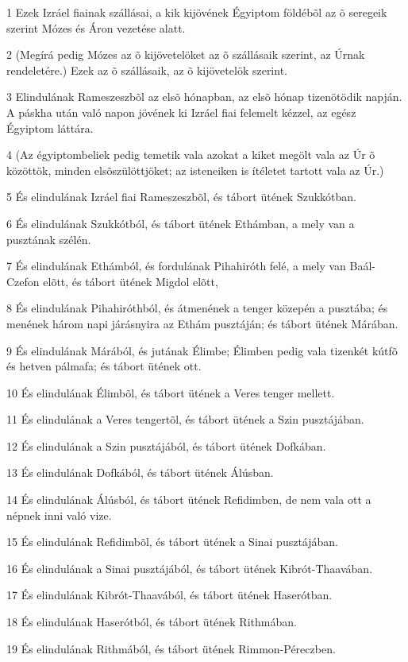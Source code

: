\par 1 Ezek Izráel fiainak szállásai, a kik kijövének Égyiptom földébõl az õ seregeik szerint Mózes és Áron vezetése alatt.
\par 2 (Megírá pedig Mózes az õ kijövetelöket az õ szállásaik szerint, az Úrnak rendeletére.) Ezek az õ szállásaik, az õ kijövetelök szerint.
\par 3 Elindulának Rameszeszbõl az elsõ hónapban, az elsõ hónap tizenötödik napján. A páskha után való napon jövének ki Izráel fiai felemelt kézzel, az egész Égyiptom láttára.
\par 4 (Az égyiptombeliek pedig temetik vala azokat a kiket megölt vala az Úr õ közöttök, minden elsõszülöttjöket; az isteneiken is ítéletet tartott vala az Úr.)
\par 5 És elindulának Izráel fiai Rameszeszbõl, és tábort ütének Szukkótban.
\par 6 És elindulának Szukkótból, és tábort ütének Ethámban, a mely van a pusztának szélén.
\par 7 És elindulának Ethámból, és fordulának Pihahiróth felé, a mely van Baál-Czefon elõtt, és tábort ütének Migdol elõtt,
\par 8 És elindulának Pihahiróthból, és átmenének a tenger közepén a pusztába; és menének három napi járásnyira az Ethám pusztáján; és tábort ütének Márában.
\par 9 És elindulának Márából, és jutának Élimbe; Élimben pedig vala tizenkét kútfõ és hetven pálmafa; és tábort ütének ott.
\par 10 És elindulának Élimbõl, és tábort ütének a Veres tenger mellett.
\par 11 És elindulának a Veres tengertõl, és tábort ütének a Szin pusztájában.
\par 12 És elindulának a Szin pusztájából, és tábort ütének Dofkában.
\par 13 És elindulának Dofkából, és tábort ütének Álúsban.
\par 14 És elindulának Álúsból, és tábort ütének Refidimben, de nem vala ott a népnek inni való vize.
\par 15 És elindulának Refidimbõl, és tábort ütének a Sinai pusztájában.
\par 16 És elindulának a Sinai pusztájából, és tábort ütének Kibrót-Thaavában.
\par 17 És elindulának Kibrót-Thaavából, és tábort ütének Haserótban.
\par 18 És elindulának Haserótból, és tábort ütének Rithmában.
\par 19 És elindulának Rithmából, és tábort ütének Rimmon-Péreczben.
